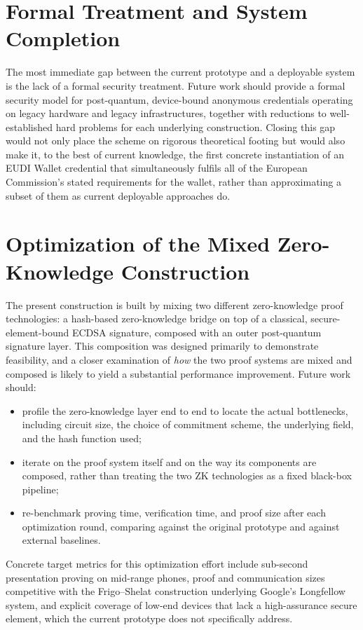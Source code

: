 \documentclass[binding=0.6cm,oneside,noexaminfo]{sapthesis}
\begin{document}
\section{Formal Treatment and System Completion}

The most immediate gap between the current prototype and a deployable system is the lack of a formal security treatment. Future work should provide a formal security model for post-quantum, device-bound anonymous credentials operating on legacy hardware and legacy infrastructures, together with reductions to well-established hard problems for each underlying construction. Closing this gap would not only place the scheme on rigorous theoretical footing but would also make it, to the best of current knowledge, the first concrete instantiation of an EUDI Wallet credential that simultaneously fulfils all of the European Commission's stated requirements for the wallet, rather than approximating a subset of them as current deployable approaches do.

\section{Optimization of the Mixed Zero-Knowledge Construction}

The present construction is built by mixing two different zero-knowledge proof technologies: a hash-based zero-knowledge bridge on top of a classical, secure-element-bound ECDSA signature, composed with an outer post-quantum signature layer. This composition was designed primarily to demonstrate feasibility, and a closer examination of \emph{how} the two proof systems are mixed and composed is likely to yield a substantial performance improvement. Future work should:
\begin{itemize}
    \item profile the zero-knowledge layer end to end to locate the actual bottlenecks, including circuit size, the choice of commitment scheme, the underlying field, and the hash function used;
    \item iterate on the proof system itself and on the way its components are composed, rather than treating the two ZK technologies as a fixed black-box pipeline;
    \item re-benchmark proving time, verification time, and proof size after each optimization round, comparing against the original prototype and against external baselines.
\end{itemize}
Concrete target metrics for this optimization effort include sub-second presentation proving on mid-range phones, proof and communication sizes competitive with the Frigo--Shelat construction underlying Google's Longfellow system, and explicit coverage of low-end devices that lack a high-assurance secure element, which the current prototype does not specifically address.
\end{document}
